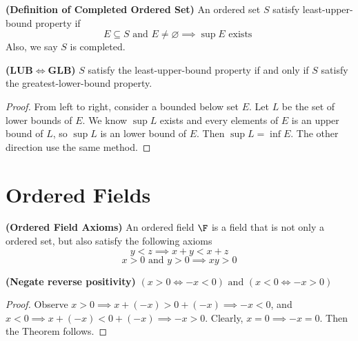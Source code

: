 \documentclass{report}
\begin{document}
\begin{definition}
\label{1.1.11}
  \textbf{(Definition of Completed Ordered Set)}
An ordered set $S$ satisfy least-upper-bound property if
\begin{equation*}
E\subseteq S\text{ and }E\neq \varnothing\implies \sup E\text{ exists }
\end{equation*}
Also, we say $S$ is completed.
\end{definition}
\begin{theorem}
\label{1.1.12}
  \textbf{(LUB$\iff $GLB)} $S$ satisfy the least-upper-bound property if and only if  $S$ satisfy the greatest-lower-bound property.
\end{theorem}
\begin{proof}
  From left to right, consider a bounded below set $E$.  Let $L$ be the set of lower bounds of  $E$. We know $\sup L$ exists and every elements of $E$ is an upper bound of $L$, so $\sup L$ is an lower bound of $E$. Then $\sup L=\inf E$. The other direction use the same method. 
\end{proof}
\section{Ordered Fields}
\begin{axiom}
\label{1.2.1}
\textbf{(Ordered Field Axioms)} An ordered field $\F$ is a field that is not only a ordered set, but also satisfy the following axioms
\begin{equation*}
y<z\implies x+y<x+z
\end{equation*}
\begin{equation*}
x>0\text{ and }y>0\implies xy>0
\end{equation*}
\end{axiom}
\begin{theorem}
\label{1.2.2}
\textbf{(Negate reverse positivity)} $(x>0\iff -x<0)\text{ and }(x<0\iff -x>0)$
\end{theorem}
\begin{proof}
  Observe $x>0\implies x+(-x)>0+(-x)\implies -x<0$, and $x<0\implies x+(-x)<0+(-x)\implies -x>0$. Clearly, $x=0\implies -x=0$. Then the Theorem follows.
\end{proof}
\end{document}
